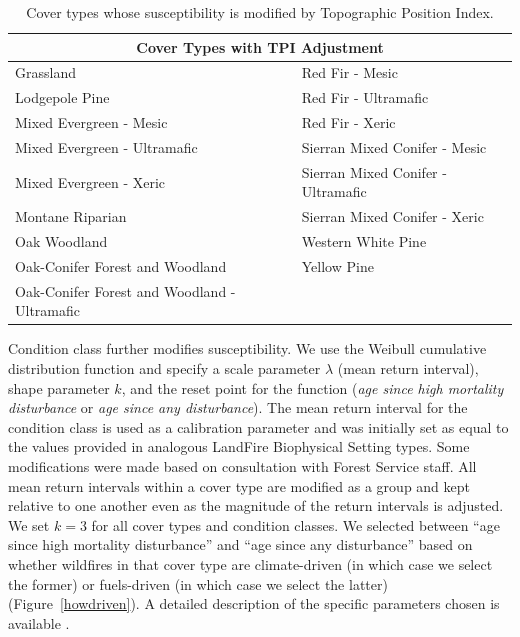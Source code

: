 \begin{itemize}
\begin{table}[htbp]
\small
\centering
\caption{Cover types whose susceptibility is modified by Topographic Position Index.}
\label{covtpi}
\begin{tabular}{ll}
\hline
\multicolumn{2}{c}{\textbf{Cover Types with TPI Adjustment}} \\
\hline
Grassland     									& Red Fir - Mesic   					\\
Lodgepole Pine    								& Red Fir - Ultramafic					\\
Mixed Evergreen - Mesic							& Red Fir - Xeric    					\\
Mixed Evergreen - Ultramafic     				& Sierran Mixed Conifer - Mesic    		\\
Mixed Evergreen - Xeric 						& Sierran Mixed Conifer - Ultramafic 	\\
Montane Riparian								& Sierran Mixed Conifer - Xeric 		\\
Oak Woodland 									& Western White Pine					\\
Oak-Conifer Forest and Woodland 				& Yellow Pine 							\\
Oak-Conifer Forest and Woodland - Ultramafic 	&										\\
\hline
\end{tabular}

\end{table}

Condition class further modifies susceptibility. We use the Weibull cumulative distribution function and specify a scale parameter $\lambda$ (mean return interval), shape parameter $k$, and the reset point for the function (\emph{age since high mortality disturbance} or \emph{age since any disturbance}). The mean return interval for the condition class is used as a calibration parameter and was initially set as equal to the values provided in analogous LandFire Biophysical Setting types. Some modifications were made based on consultation with Forest Service staff. All mean return intervals within a cover type are modified as a group and kept relative to one another even as the magnitude of the return intervals is adjusted. We set $k=3$ for all cover types and condition classes. We selected between ``age since high mortality disturbance'' and ``age since any disturbance'' based on whether wildfires in that cover type are climate-driven (in which case we select the former) or fuels-driven (in which case we select the latter) (Figure~\ref{howdriven}). A detailed description of the specific parameters chosen is available .


\end{itemize}
